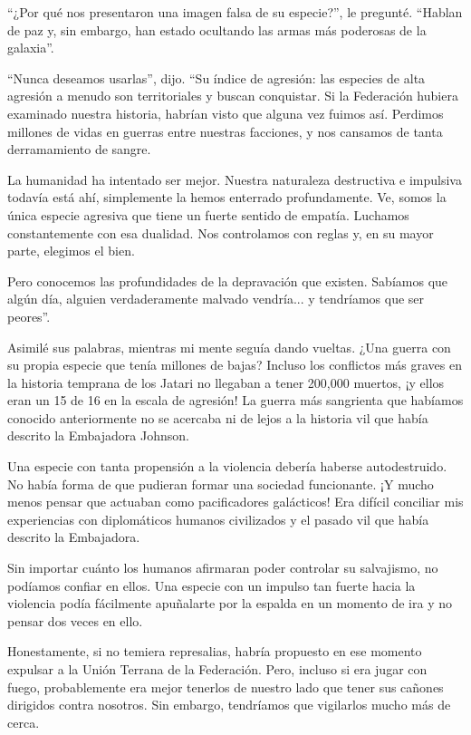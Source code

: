 ``¿Por qué nos presentaron una imagen falsa de su especie?'', le pregunté. ``Hablan de paz y, sin embargo, han estado ocultando las armas más poderosas de la galaxia''.

``Nunca deseamos usarlas'', dijo. ``Su índice de agresión: las especies de alta agresión a menudo son territoriales y buscan conquistar. Si la Federación hubiera examinado nuestra historia, habrían visto que alguna vez fuimos así. Perdimos millones de vidas en guerras entre nuestras facciones, y nos cansamos de tanta derramamiento de sangre.

La humanidad ha intentado ser mejor. Nuestra naturaleza destructiva e impulsiva todavía está ahí, simplemente la hemos enterrado profundamente. Ve, somos la única especie agresiva que tiene un fuerte sentido de empatía. Luchamos constantemente con esa dualidad. Nos controlamos con reglas y, en su mayor parte, elegimos el bien.

Pero conocemos las profundidades de la depravación que existen. Sabíamos que algún día, alguien verdaderamente malvado vendría... y tendríamos que ser peores''.

Asimilé sus palabras, mientras mi mente seguía dando vueltas. ¿Una guerra con su propia especie que tenía millones de bajas? Incluso los conflictos más graves en la historia temprana de los Jatari no llegaban a tener 200,000 muertos, ¡y ellos eran un 15 de 16 en la escala de agresión! La guerra más sangrienta que habíamos conocido anteriormente no se acercaba ni de lejos a la historia vil que había descrito la Embajadora Johnson.

Una especie con tanta propensión a la violencia debería haberse autodestruido. No había forma de que pudieran formar una sociedad funcionante. ¡Y mucho menos pensar que actuaban como pacificadores galácticos! Era difícil conciliar mis experiencias con diplomáticos humanos civilizados y el pasado vil que había descrito la Embajadora.

Sin importar cuánto los humanos afirmaran poder controlar su salvajismo, no podíamos confiar en ellos. Una especie con un impulso tan fuerte hacia la violencia podía fácilmente apuñalarte por la espalda en un momento de ira y no pensar dos veces en ello.

Honestamente, si no temiera represalias, habría propuesto en ese momento expulsar a la Unión Terrana de la Federación. Pero, incluso si era jugar con fuego, probablemente era mejor tenerlos de nuestro lado que tener sus cañones dirigidos contra nosotros. Sin embargo, tendríamos que vigilarlos mucho más de cerca.

